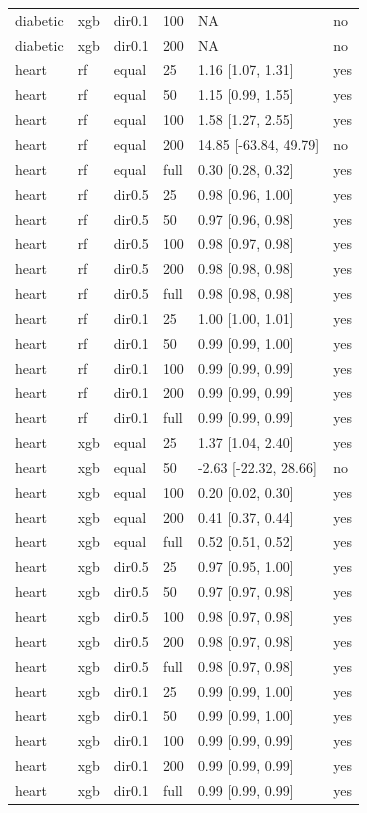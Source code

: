 \begin{tabular}{llllll}
diabetic & xgb & dir0.1 & 100 & NA & no \\
diabetic & xgb & dir0.1 & 200 & NA & no \\
\addlinespace
heart & rf & equal & 25 & 1.16 [1.07, 1.31] & yes \\
heart & rf & equal & 50 & 1.15 [0.99, 1.55] & yes \\
heart & rf & equal & 100 & 1.58 [1.27, 2.55] & yes \\
heart & rf & equal & 200 & 14.85 [-63.84, 49.79] & no \\
heart & rf & equal & full & 0.30 [0.28, 0.32] & yes \\
heart & rf & dir0.5 & 25 & 0.98 [0.96, 1.00] & yes \\
heart & rf & dir0.5 & 50 & 0.97 [0.96, 0.98] & yes \\
heart & rf & dir0.5 & 100 & 0.98 [0.97, 0.98] & yes \\
heart & rf & dir0.5 & 200 & 0.98 [0.98, 0.98] & yes \\
heart & rf & dir0.5 & full & 0.98 [0.98, 0.98] & yes \\
heart & rf & dir0.1 & 25 & 1.00 [1.00, 1.01] & yes \\
heart & rf & dir0.1 & 50 & 0.99 [0.99, 1.00] & yes \\
heart & rf & dir0.1 & 100 & 0.99 [0.99, 0.99] & yes \\
heart & rf & dir0.1 & 200 & 0.99 [0.99, 0.99] & yes \\
heart & rf & dir0.1 & full & 0.99 [0.99, 0.99] & yes \\
heart & xgb & equal & 25 & 1.37 [1.04, 2.40] & yes \\
heart & xgb & equal & 50 & -2.63 [-22.32, 28.66] & no \\
heart & xgb & equal & 100 & 0.20 [0.02, 0.30] & yes \\
heart & xgb & equal & 200 & 0.41 [0.37, 0.44] & yes \\
heart & xgb & equal & full & 0.52 [0.51, 0.52] & yes \\
heart & xgb & dir0.5 & 25 & 0.97 [0.95, 1.00] & yes \\
heart & xgb & dir0.5 & 50 & 0.97 [0.97, 0.98] & yes \\
heart & xgb & dir0.5 & 100 & 0.98 [0.97, 0.98] & yes \\
heart & xgb & dir0.5 & 200 & 0.98 [0.97, 0.98] & yes \\
heart & xgb & dir0.5 & full & 0.98 [0.97, 0.98] & yes \\
heart & xgb & dir0.1 & 25 & 0.99 [0.99, 1.00] & yes \\
heart & xgb & dir0.1 & 50 & 0.99 [0.99, 1.00] & yes \\
heart & xgb & dir0.1 & 100 & 0.99 [0.99, 0.99] & yes \\
heart & xgb & dir0.1 & 200 & 0.99 [0.99, 0.99] & yes \\
heart & xgb & dir0.1 & full & 0.99 [0.99, 0.99] & yes \\
\bottomrule
\end{tabular}
